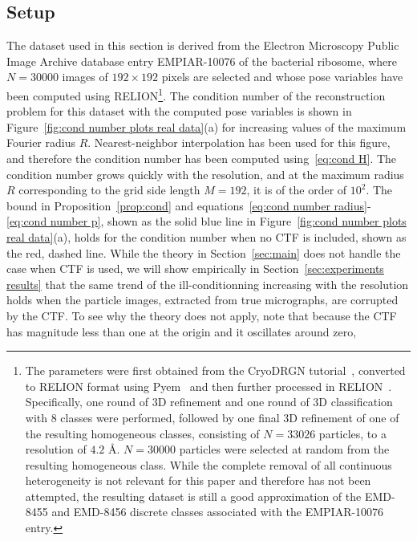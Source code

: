 \documentclass{article}
\begin{document}
\subsection{Setup}

The dataset used in this section is derived from the Electron Microscopy Public 
Image Archive database entry EMPIAR-10076 of the bacterial ribosome, where 
$N=30000$ images of $192 \times 192$ pixels are selected and whose pose variables 
have been computed using RELION\footnote{
    The parameters were first obtained from the CryoDRGN tutorial~\cite{zhong_cryodrgn_2021},
    converted to RELION format using Pyem~\cite{asarnow_pyem_2019} and then further processed
    in RELION~\cite{scheres_relion_2012}. 
    Specifically, one round of 3D refinement and one round of 3D classification 
    with 8 classes were performed, followed by one final 3D refinement of one
    of the resulting homogeneous classes, consisting of $N=33026$ particles, 
    to a resolution of $4.2$ \AA. $N=30000$ particles were selected at random
    from the resulting homogeneous class.
    While the complete removal of all continuous heterogeneity is not relevant 
    for this paper and therefore has not been attempted, the resulting dataset 
    is still a good approximation of the EMD-8455 and EMD-8456 discrete classes 
    associated with the EMPIAR-10076 entry.
}. The condition number of the reconstruction 
problem for this dataset with the computed pose variables is shown in 
Figure~\ref{fig:cond number plots real data}(a) for increasing values of the 
maximum Fourier radius $R$. Nearest-neighbor interpolation has been used for this
figure, and therefore the condition number has been computed using~\eqref{eq:cond H}.
The condition number grows quickly with the resolution, and at the maximum radius 
$R$ corresponding to the grid side length $M=192$, it is of the order of $10^2$.
The bound in Proposition~\eqref{prop:cond} and 
equations~\eqref{eq:cond number radius}-\eqref{eq:cond number p}, shown as the solid 
blue line in Figure~\ref{fig:cond number plots real data}(a), holds for the condition
number when no CTF is included, shown as the red, dashed line. 
While the theory in Section~\ref{sec:main} does not handle the case when CTF is used, we will show empirically in Section~\ref{sec:experiments results} that the same trend of the ill-conditionning increasing with the resolution holds when the particle images, extracted from true micrographs, are corrupted by the CTF.
To see why the theory does not apply, note that because the CTF has magnitude less than one at the origin and it oscillates around zero, 
\end{document}
